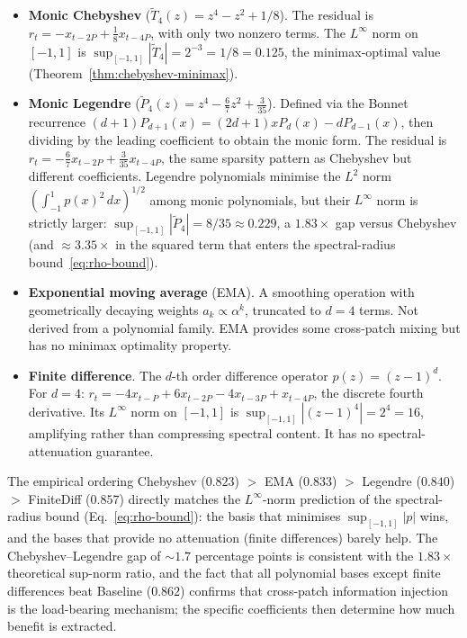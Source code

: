 \documentclass[11pt]{article}
\theoremstyle{plain}
\theoremstyle{definition}
\theoremstyle{remark}
\newcommand{\abs}[1]{\left\lvert#1\right\rvert}
\newcommand{\Baseline}{\textsf{Baseline}}
\begin{document}
\begin{itemize}[leftmargin=1.5em, itemsep=0.3em, topsep=0.3em]
    \item \textbf{Monic Chebyshev} ($\tilde T_4(z) = z^4 - z^2 + 1/8$). The residual is $r_t = -x_{t-2P} + \tfrac{1}{8} x_{t-4P}$, with only two nonzero terms. The $L^\infty$ norm on $[-1,1]$ is $\sup_{[-1,1]} \abs{\tilde T_4} = 2^{-3} = 1/8 = 0.125$, the minimax-optimal value (Theorem~\ref{thm:chebyshev-minimax}).

    \item \textbf{Monic Legendre} ($\tilde P_4(z) = z^4 - \tfrac{6}{7}z^2 + \tfrac{3}{35}$). Defined via the Bonnet recurrence $(d{+}1)P_{d+1}(x) = (2d{+}1)x P_d(x) - d P_{d-1}(x)$, then dividing by the leading coefficient to obtain the monic form. The residual is $r_t = -\tfrac{6}{7} x_{t-2P} + \tfrac{3}{35} x_{t-4P}$, the same sparsity pattern as Chebyshev but different coefficients. Legendre polynomials minimise the $L^2$ norm $(\int_{-1}^1 p(x)^2\, dx)^{1/2}$ among monic polynomials, but their $L^\infty$ norm is strictly larger: $\sup_{[-1,1]} \abs{\tilde P_4} = 8/35 \approx 0.229$, a $1.83\times$ gap versus Chebyshev (and $\approx 3.35\times$ in the squared term that enters the spectral-radius bound~\eqref{eq:rho-bound}).

    \item \textbf{Exponential moving average} (EMA). A smoothing operation with geometrically decaying weights $a_k \propto \alpha^k$, truncated to $d = 4$ terms. Not derived from a polynomial family. EMA provides some cross-patch mixing but has no minimax optimality property.

    \item \textbf{Finite difference}. The $d$-th order difference operator $p(z) = (z - 1)^d$. For $d = 4$: $r_t = -4 x_{t-P} + 6 x_{t-2P} - 4 x_{t-3P} + x_{t-4P}$, the discrete fourth derivative. Its $L^\infty$ norm on $[-1,1]$ is $\sup_{[-1,1]} \abs{(z-1)^4} = 2^4 = 16$, amplifying rather than compressing spectral content. It has no spectral-attenuation guarantee.
\end{itemize}

The empirical ordering Chebyshev ($0.823$) $>$ EMA ($0.833$) $>$ Legendre ($0.840$) $>$ FiniteDiff ($0.857$) directly matches the $L^\infty$-norm prediction of the spectral-radius bound (Eq.~\eqref{eq:rho-bound}): the basis that minimises $\sup_{[-1,1]} \abs{p}$ wins, and the bases that provide no attenuation (finite differences) barely help. The Chebyshev--Legendre gap of $\sim 1.7$ percentage points is consistent with the $1.83\times$ theoretical sup-norm ratio, and the fact that all polynomial bases except finite differences beat \Baseline{} ($0.862$) confirms that cross-patch information injection is the load-bearing mechanism; the specific coefficients then determine how much benefit is extracted.
\end{document}
